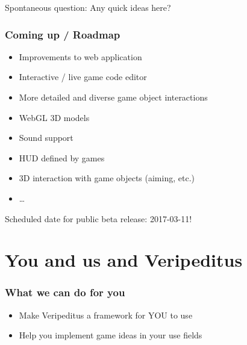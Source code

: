 \documentclass[aspectratio=43]{beamer}
\begin{document}
{ \begin{frame}
  \Large
  Spontaneous question: Any quick ideas here?
 \end{frame}


 \begin{frame}
  \frametitle{Coming up / Roadmap}

  \begin{itemize}
   \item{Improvements to web application}
   \item{Interactive / live game code editor}
   \item{More detailed and diverse game object interactions}
   \item{WebGL 3D models}
   \item{Sound support}
   \item{HUD defined by games}
   \item{3D interaction with game objects (aiming, etc.)}
   \item{…}
  \end{itemize}

  Scheduled date for public beta release: 2017-03-11!
 \end{frame}


 \section{You and us and Veripeditus}

 \begin{frame}
  \frametitle{What we can do for you}

  \begin{itemize}
   \item{Make Veripeditus a framework for YOU to use}
   \item{Help you implement game ideas in your use fields}
  \end{itemize}
 \end{frame}

}
\end{document}
